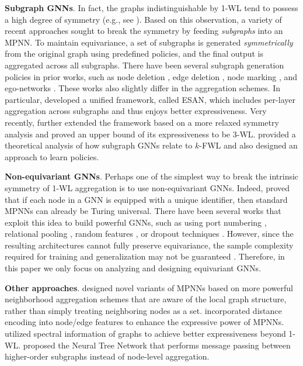 \documentclass{article} %
\let\cref\crtcref
\begin{document}
\textbf{Subgraph GNNs}. In fact, the graphs indistinguishable by 1-WL tend to possess a high degree of symmetry (e.g., see \cref{fig:counterexamples}). Based on this observation, a variety of recent approaches sought to break the symmetry by feeding \emph{subgraphs} into an MPNN. To maintain equivariance, a set of subgraphs is generated \emph{symmetrically} from the original graph using predefined policies, and the final output is aggregated across all subgraphs. There have been several subgraph generation policies in prior works, such as node deletion \citep{cotta2021reconstruction}, edge deletion \citep{bevilacqua2022equivariant}, node marking \citep{papp2022theoretical}, and ego-networks \citep{zhao2022stars,zhang2021nested,you2021identity}. These works also slightly differ in the aggregation schemes. In particular, \citet{bevilacqua2022equivariant} developed a unified framework, called ESAN, which includes per-layer aggregation across subgraphs and thus enjoys better expressiveness. Very recently, \cite{frasca2022Understanding} further extended the framework based on a more relaxed symmetry analysis and proved an upper bound of its expressiveness to be 3-WL. \cite{qian2022ordered} provided a theoretical analysis of how subgraph GNNs relate to $k$-FWL and also designed an approach to learn policies.

\textbf{Non-equivariant GNNs}. Perhaps one of the simplest way to break the intrinsic symmetry of 1-WL aggregation is to use non-equivariant GNNs. Indeed, \citet{loukas2020graph} proved that if each node in a GNN is equipped with a unique identifier, then standard MPNNs can already be Turing universal. There have been several works that exploit this idea to build powerful GNNs, such as using port numbering \citep{sato2019approximation}, relational pooling \citep{murphy2019relational}, random features \citep{sato2021random,abboud2020surprising}, or dropout techniques \citep{papp2021dropgnn}. However, since the resulting architectures cannot fully preserve equivariance, the sample complexity required for training and generalization may not be guaranteed \citep{garg2020generalization}. Therefore, in this paper we only focus on analyzing and designing equivariant GNNs.

\textbf{Other approaches}. \citet{wijesinghe2022new,de2020natural} designed novel variants of MPNNs based on more powerful neighborhood aggregation schemes that are aware of the local graph structure, rather than simply treating neighboring nodes as a set. \citet{li2020distance,velingker2022affinity} incorporated distance encoding into node/edge features to enhance the expressive power of MPNNs. \citet{balcilar2021breaking,feldman2022weisfeiler} utilized spectral information of graphs to achieve better expressiveness beyond 1-WL. \citet{talak2021neural} proposed the Neural Tree Network that performs message passing between higher-order subgraphs instead of node-level aggregation.
\end{document}
